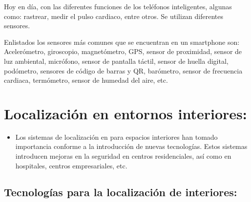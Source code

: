 \documentclass[conference,compsoc,onecolumn]{IEEEtran}
\begin{document}
Hoy en día, con las diferentes funciones de los teléfonos inteligentes, algunas como: rastrear, medir el pulso cardiaco, entre otros. Se utilizan diferentes sensores.

\enskip 

Enlistados los sensores más comunes que se encuentran en un smartphone son:
Acelerómetro, giroscopio, magnetómetro, GPS, sensor de proximidad, sensor de luz ambiental, micrófono, sensor de pantalla táctil, sensor de huella digital, podómetro, sensores de código de barras y QR, barómetro, sensor de frecuencia cardiaca, termómetro, sensor de humedad del aire, etc.


\section{Localización en entornos interiores:}

\begin{itemize}
\item Los sistemas de localización en para espacios interiores han tomado importancia conforme a la
introducción de nuevas tecnologías. Estos sistemas introducen mejoras en la seguridad en centros
residenciales, así como en hospitales, centros empresariales, etc.

\end{itemize}


\subsection{Tecnologías para la localización de interiores:}    
\end{document}
